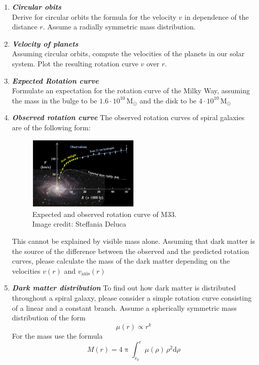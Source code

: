 \documentclass[a4paper,12pt]{article}
\newcommand{\question}[1]{\textbf{\textit{#1}}}
\renewcommand{\pi}{\uppi}
\begin{document}
\begin{enumerate}
\item \question{Circular obits}\\
Derive for circular orbits the formula for the velocity $v$ in dependence of the distance $r$. Assume a radially symmetric mass distribution.
\item \question{Velocity of planets}\\
Assuming circular orbits, compute the velocities of the planets in our solar system. Plot the resulting rotation curve $v$ over $r$.
\item \question{Expected Rotation curve}\\
Formulate an expectation for the rotation curve of the Milky Way, assuming the mass in the bulge to be $1.6\cdot 10^{10}\,\text{M}_\odot$ and the disk to be $4\cdot 10^{10}\,\text{M}_\odot$
\item \question{Observed rotation curve}
The observed rotation curves of spiral galaxies are of the following form:
\begin{figure}[h]
	\centering
	\includegraphics[width=0.5\textwidth]{figures/rotationcurve.png}
	\caption{Expected and observed rotation curve of M33.\\Image credit: Steffania Deluca}
\end{figure}
This cannot be explained by visible mass alone. Assuming that dark matter is the source of the difference between the observed and the predicted rotation curves, please calculate the mass of the dark matter depending on the velocities $v(r)$ and $v_{\text{axis}}(r)$
\item \question{Dark matter distribution}
To find out how dark matter is distributed throughout a spiral galaxy, please consider a simple rotation curve consisting of a linear and a constant branch. Assume a spherically symmetric mass distribution of the form 
\begin{equation*}
\mu(r) \propto r^k
\end{equation*}
For the mass use the formula
\begin{equation*}
M(r) = 4\pi\int_{r_0}^{r}\mu(\rho)\,\rho^2 \text{d}\rho
\end{equation*}

\end{enumerate}
\end{document}
